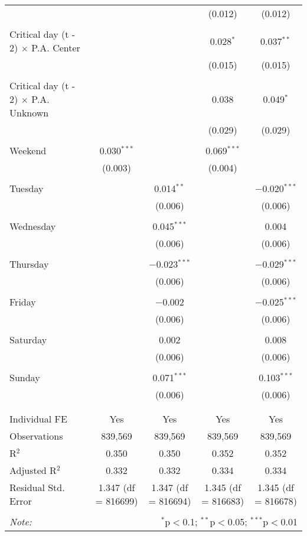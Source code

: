 \documentclass[
]{article}
\begin{document}
\begin{table}[!htbp]
{\begin{tabular}{@{\extracolsep{5pt}}lcccc}
  &  &  & (0.012) & (0.012) \\ 
  & & & & \\ 
 Critical day (t - 2) $\times$ P.A. Center &  &  & 0.028$^{*}$ & 0.037$^{**}$ \\ 
  &  &  & (0.015) & (0.015) \\ 
  & & & & \\ 
 Critical day (t - 2) $\times$ P.A. Unknown &  &  & 0.038 & 0.049$^{*}$ \\ 
  &  &  & (0.029) & (0.029) \\ 
  & & & & \\ 
 Weekend & 0.030$^{***}$ &  & 0.069$^{***}$ &  \\ 
  & (0.003) &  & (0.004) &  \\ 
  & & & & \\ 
 Tuesday &  & 0.014$^{**}$ &  & $-$0.020$^{***}$ \\ 
  &  & (0.006) &  & (0.006) \\ 
  & & & & \\ 
 Wednesday &  & 0.045$^{***}$ &  & 0.004 \\ 
  &  & (0.006) &  & (0.006) \\ 
  & & & & \\ 
 Thursday &  & $-$0.023$^{***}$ &  & $-$0.029$^{***}$ \\ 
  &  & (0.006) &  & (0.006) \\ 
  & & & & \\ 
 Friday &  & $-$0.002 &  & $-$0.025$^{***}$ \\ 
  &  & (0.006) &  & (0.006) \\ 
  & & & & \\ 
 Saturday &  & 0.002 &  & 0.008 \\ 
  &  & (0.006) &  & (0.006) \\ 
  & & & & \\ 
 Sunday &  & 0.071$^{***}$ &  & 0.103$^{***}$ \\ 
  &  & (0.006) &  & (0.006) \\ 
  & & & & \\ 
\hline \\[-1.8ex] 
Individual FE & Yes & Yes & Yes & Yes \\ 
Observations & 839,569 & 839,569 & 839,569 & 839,569 \\ 
R$^{2}$ & 0.350 & 0.350 & 0.352 & 0.352 \\ 
Adjusted R$^{2}$ & 0.332 & 0.332 & 0.334 & 0.334 \\ 
Residual Std. Error & 1.347 (df = 816699) & 1.347 (df = 816694) & 1.345 (df = 816683) & 1.345 (df = 816678) \\ 
\hline 
\hline \\[-1.8ex] 
\textit{Note:}  & \multicolumn{4}{r}{$^{*}$p$<$0.1; $^{**}$p$<$0.05; $^{***}$p$<$0.01} \\ 
\end{tabular}
} 
\end{table} 
\newpage
\end{document}
